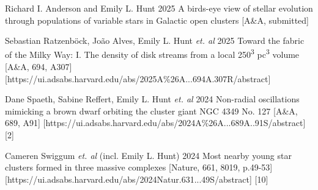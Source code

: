 \begin{etaremune}
    \item \publication 
        {Richard I. Anderson and Emily L. Hunt}
        {2025}
        {A birds-eye view of stellar evolution through populations of variable stars in Galactic open clusters}
        [A\&A, submitted]
    \item \publication 
        {Sebastian Ratzenböck, João Alves, Emily L. Hunt \emph{et. al}}
        {2025}
        {Toward the fabric of the Milky Way: I. The density of disk streams from a local 250\textsuperscript{3} pc\textsuperscript{3} volume}
        [A\&A, 694, A307]
        [https://ui.adsabs.harvard.edu/abs/2025A\%26A...694A.307R/abstract]
    \item \publication
        {Dane Spaeth, Sabine Reffert, Emily L. Hunt \emph{et. al}}
        {2024}
        {Non-radial oscillations mimicking a brown dwarf orbiting the cluster giant NGC 4349 No. 127}
        [A\&A, 689, A91]
        [https://ui.adsabs.harvard.edu/abs/2024A\%26A...689A..91S/abstract]
        [2]
    \item \publication
        {Cameren Swiggum \emph{et. al} (incl. Emily L. Hunt)}
        {2024}
        {Most nearby young star clusters formed in three massive complexes }
        [Nature, 661, 8019, p.49-53]
        [https://ui.adsabs.harvard.edu/abs/2024Natur.631...49S/abstract]
        [10]
\end{etaremune}
